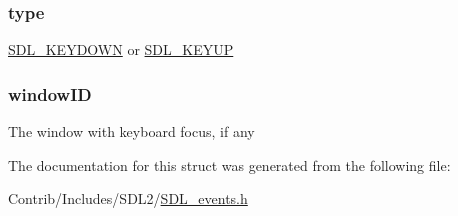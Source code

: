 \subsubsection[{\texorpdfstring{type}{type}}]{ type}\hypertarget{struct_s_d_l___keyboard_event_aa40a9b05c3154032b9f2d7220e9f08dc}{}\label{struct_s_d_l___keyboard_event_aa40a9b05c3154032b9f2d7220e9f08dc}
\hyperlink{_s_d_l__events_8h_a3b589e89be6b35c02e0dd34a55f3fccaacaf8cfd53c985cdbf6a90c811d51a1fc}{S\+D\+L\+\_\+\+K\+E\+Y\+D\+O\+WN} or \hyperlink{_s_d_l__events_8h_a3b589e89be6b35c02e0dd34a55f3fccaadefb8866b9d28be21c2c33c35cc66c4b}{S\+D\+L\+\_\+\+K\+E\+Y\+UP} 
\subsubsection[{\texorpdfstring{window\+ID}{windowID}}]{ window\+ID}\hypertarget{struct_s_d_l___keyboard_event_a78d9995068d6f40cd78bb8db7351b0a1}{}\label{struct_s_d_l___keyboard_event_a78d9995068d6f40cd78bb8db7351b0a1}
The window with keyboard focus, if any 

The documentation for this struct was generated from the following file\+:\begin{DoxyCompactItemize}
\item 
Contrib/\+Includes/\+S\+D\+L2/\hyperlink{_s_d_l__events_8h}{S\+D\+L\+\_\+events.\+h}\end{DoxyCompactItemize}
